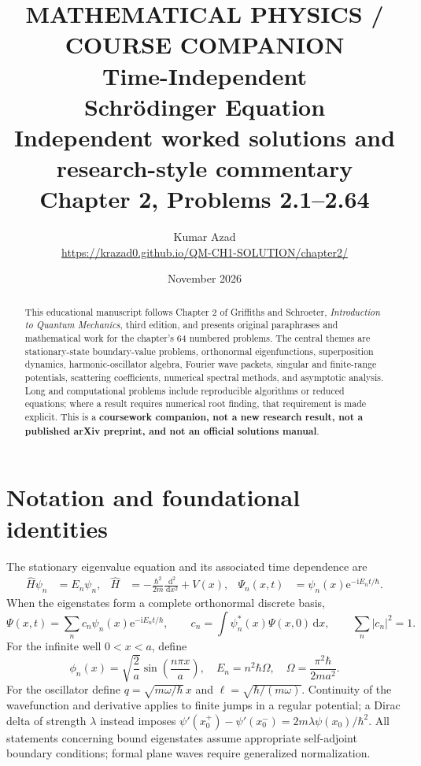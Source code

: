 \documentclass[11pt,a4paper]{article}
\title{\vspace{-1.4cm}\textcolor{accent}{\large MATHEMATICAL PHYSICS / COURSE COMPANION}\\[12pt]
\textbf{\Huge Time-Independent\\[3pt] Schrödinger Equation}\\[13pt]
{\large Independent worked solutions and research-style commentary}\\[5pt]
{\normalsize Chapter 2, Problems 2.1--2.64}}
\author{Kumar Azad\\[-1pt]\small\url{https://krazad0.github.io/QM-CH1-SOLUTION/chapter2/}}
\date{November 2026}
\numberwithin{equation}{section}
\newcommand{\dd}{\,\mathrm d}
\newcommand{\ii}{\mathrm i}
\newcommand{\ee}{\mathrm e}
\begin{document}
\maketitle
\begin{abstract}
This educational manuscript follows Chapter 2 of Griffiths and Schroeter,
\textit{Introduction to Quantum Mechanics}, third edition, and presents original
paraphrases and mathematical work for the chapter's 64 numbered problems.
The central themes are stationary-state boundary-value problems, orthonormal
eigenfunctions, superposition dynamics, harmonic-oscillator algebra, Fourier
wave packets, singular and finite-range potentials, scattering coefficients,
numerical spectral methods, and asymptotic analysis.
Long and computational problems include reproducible algorithms or reduced
equations; where a result requires numerical root finding, that requirement is
made explicit. This is a \textbf{coursework companion, not a new research result,
not a published arXiv preprint, and not an official solutions manual}.
\end{abstract}

\tableofcontents
\section{Notation and foundational identities}
The stationary eigenvalue equation and its associated time dependence are
\begin{align}
\hat H\psi_n&=E_n\psi_n,&
\hat H&=-\frac{\hbar^2}{2m}\frac{\dd^2}{\dd x^2}+V(x),&
\Psi_n(x,t)&=\psi_n(x)\ee^{-\ii E_nt/\hbar}.
\end{align}
When the eigenstates form a complete orthonormal discrete basis,
\begin{equation}
\Psi(x,t)=\sum_n c_n\psi_n(x)\ee^{-\ii E_nt/\hbar},\qquad
c_n=\int\psi_n^*(x)\Psi(x,0)\dd x,\qquad
\sum_n|c_n|^2=1.
\end{equation}
For the infinite well $0<x<a$, define
\begin{equation}
\phi_n(x)=\sqrt{\frac2a}\sin\left(\frac{n\pi x}{a}\right),\quad
E_n=n^2\hbar\Omega,\quad
\Omega=\frac{\pi^2\hbar}{2ma^2}.
\end{equation}
For the oscillator define $q=\sqrt{m\omega/\hbar}\,x$ and
$\ell=\sqrt{\hbar/(m\omega)}$.
Continuity of the wavefunction and derivative applies to finite jumps in a
regular potential; a Dirac delta of strength $\lambda$ instead imposes
$\psi'(x_0^+)-\psi'(x_0^-)=2m\lambda\psi(x_0)/\hbar^2$.
All statements concerning bound eigenstates assume appropriate self-adjoint
boundary conditions; formal plane waves require generalized normalization.
\end{document}
